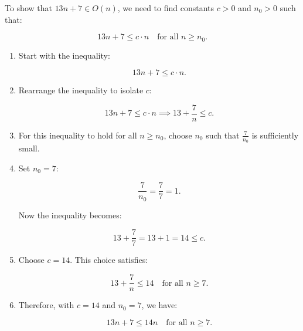     \begin{example}
        To show that \( 13n + 7 \in O(n) \), we need to find constants \( c > 0 \) and \( n_0 > 0 \) such that:

        \[
        13n + 7 \leq c \cdot n \quad \text{for all } n \geq n_0.
        \]

        \begin{enumerate}
            \item Start with the inequality:
            
            \[
            13n + 7 \leq c \cdot n.
            \]
            
            \item Rearrange the inequality to isolate \( c \):
            
            \[
            13n + 7 \leq c \cdot n \implies 13 + \frac{7}{n} \leq c.
            \]
            
            \item For this inequality to hold for all \( n \geq n_0 \), choose \( n_0 \) such that \( \frac{7}{n_0} \) is sufficiently small.
            
            \item Set \( n_0 = 7 \):
            
            \[
            \frac{7}{n_0} = \frac{7}{7} = 1.
            \]
            
            Now the inequality becomes:
            
            \[
            13 + \frac{7}{7} = 13 + 1 = 14 \leq c.
            \]
            
            \item Choose \( c = 14 \). This choice satisfies:
            
            \[
            13 + \frac{7}{n} \leq 14 \quad \text{for all } n \geq 7.
            \]
            
            \item Therefore, with \( c = 14 \) and \( n_0 = 7 \), we have:
            
            \[
            13n + 7 \leq 14n \quad \text{for all } n \geq 7.
            \]
        \end{enumerate}
    \end{example}

